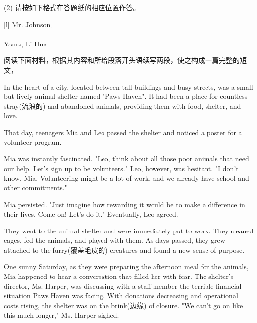 \documentclass{英语试卷}
\begin{document}
\par (2) 请按如下格式在答题纸的相应位置作答。\par
\par\vspace{0.4em}
\begin{center}\begin{tabular}{{|l|}}
\hline
Mr. Johnson, \\
 \\
Yours, Li Hua \\
\hline
\end{tabular}\end{center}
\vspace{0.4em}
\par 阅读下面材料，根据其内容和所给段落开头语续写两段，使之构成一篇完整的短文，\par
\par In the heart of a city, located between tall buildings and busy streets, was a small but lively animal shelter named "Paws Haven". It had been a place for countless stray(流浪的) and abandoned animals, providing them with food, shelter, and love.\par
\par That day, teenagers Mia and Leo passed the shelter and noticed a poster for a volunteer program.\par
\par Mia was instantly fascinated. "Leo, think about all those poor animals that need our help. Let's sign up to be volunteers." Leo, however, was hesitant. "I don't know, Mia. Volunteering might be a lot of work, and we already have school and other commitments."\par
\par Mia persisted. "Just imagine how rewarding it would be to make a difference in their lives. Come on! Let's do it." Eventually, Leo agreed.\par
\par They went to the animal shelter and were immediately put to work. They cleaned cages, fed the animals, and played with them. As days passed, they grew attached to the furry(覆盖毛皮的) creatures and found a new sense of purpose.\par
\par One sunny Saturday, as they were preparing the afternoon meal for the animals, Mia happened to hear a conversation that filled her with fear. The shelter's director, Ms. Harper, was discussing with a staff member the terrible financial situation Paws Haven was facing. With donations decreasing and operational costs rising, the shelter was on the brink(边缘) of closure. "We can't go on like this much longer," Ms. Harper sighed.\par
\end{document}
